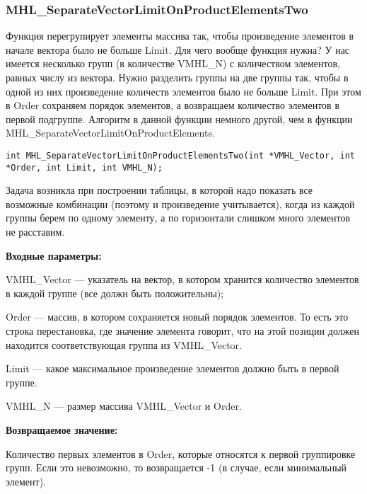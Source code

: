 \documentclass[a4paper,12pt]{article}
\begin{document}
\subsubsection{MHL\_SeparateVectorLimitOnProductElementsTwo}\label{MHL_SeparateVectorLimitOnProductElementsTwo}

Функция перегрупирует элементы массива так, чтобы произведение элементов в начале вектора было не больше Limit. Для чего вообще функция нужна? У нас имеется несколько групп (в количестве VMHL\_N) с количеством элементов, равных числу из вектора. Нужно разделить группы на две группы так, чтобы в одной из них произведение количеств элементов было не больше Limit. При этом в Order сохраняем порядок элементов, а возвращаем количество элементов в первой подгруппе. Алгоритм в данной функции немного другой, чем в функции MHL\_SeparateVectorLimitOnProductElements.


\begin{lstlisting}[label=code_syntax_MHL_SeparateVectorLimitOnProductElementsTwo,caption=Синтаксис]
int MHL_SeparateVectorLimitOnProductElementsTwo(int *VMHL_Vector, int *Order, int Limit, int VMHL_N);
\end{lstlisting}

Задача возникла при построении таблицы, в которой надо показать все возможные комбинации (поэтому и произведение учитывается), когда из каждой группы берем по одному элементу, а по горизонтали слишком много элементов не расставим.

\textbf{Входные параметры:}  
 
VMHL\_Vector --- указатель на вектор, в котором хранится количество элементов в каждой группе (все должн быть положительны);
 
Order --- массив, в котором сохраняется новый порядок элементов. То есть это строка перестановка, где значение элемента говорит, что на этой позиции должен находится соответствующая группа из VMHL\_Vector.
 
Limit --- какое максимальное произведение элементов должно быть в первой группе.
 
VMHL\_N --- размер массива VMHL\_Vector и Order.
 
\textbf{Возвращаемое значение:}

Количество первых элементов в Order, которые относятся к первой группировке групп. Если это невозможно, то возвращается -1 (в случае, если минимальный элемент).
\end{document}
